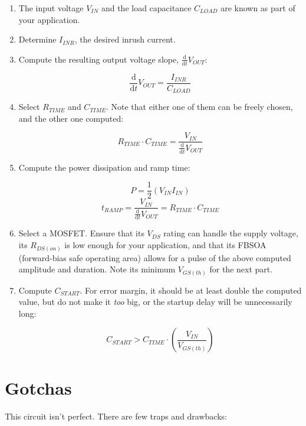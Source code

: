 \documentclass[letterpaper,12pt]{article}
\newcommand{\ddt}{\ensuremath{\frac{\mathrm{d}}{\mathrm{d}t}}}
\begin{document}
\begin{enumerate}
\item{The input voltage $V_{IN}$ and the load capacitance $C_{LOAD}$ are known as part
    of your application.}
\item{Determine $I_{INR}$, the desired inrush current.}
\item{Compute the resulting output voltage slope, $\ddt V_{OUT}$:

    $$ \ddt V_{OUT} = \frac{I_{INR}}{C_{LOAD}} $$ }
\item{Select $R_{TIME}$ and $C_{TIME}$. Note that either one of them can be freely chosen,
    and the other one computed:

    $$ R_{TIME} \cdot C_{TIME} = \frac{V_{IN}}{\ddt V_{OUT}} $$ }
\item{Compute the power dissipation and ramp time:

    $$ P = \frac{1}{2}\left( V_{IN} I_{IN} \right) $$
    $$ t_{RAMP} = \frac{V_{IN}}{\ddt V_{OUT}} = R_{TIME} \cdot C_{TIME} $$ }
\item{Select a MOSFET. Ensure that its $V_{DS}$ rating can handle the supply voltage,
its $R_{DS(on)}$ is low enough for your application, and that its FBSOA (forward-bias safe
operating area) allows for a pulse of the above computed amplitude and duration. Note its
minimum $V_{GS(th)}$ for the next part.}

\item{Compute $C_{START}$. For error margin, it should be at least double the computed
value, but do not make it \emph{too} big, or the startup delay will be unnecessarily long:

    $$ C_{START} > C_{TIME} \cdot \left( \frac{V_{IN}}{V_{GS(th)}} \right) $$}

\end{enumerate}

\section{Gotchas}
\label{sec:gotchas}

This circuit isn't perfect. There are few traps and drawbacks:
\end{document}
